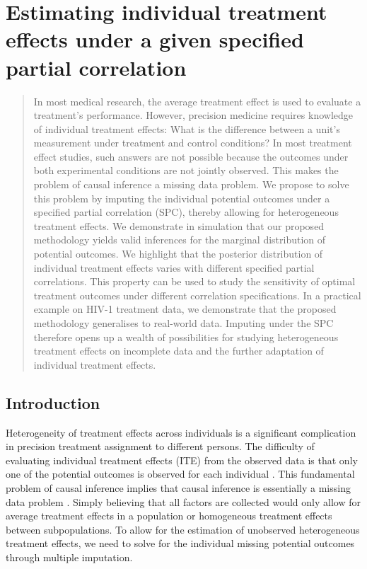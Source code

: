 \chapter{Estimating individual treatment effects under a given specified partial correlation} 
\label{chap4}
	\begin{abstract}
		In most medical research, the average treatment effect is used to evaluate a treatment's performance. However, precision medicine requires knowledge of individual treatment effects: What is the difference between a unit's measurement under treatment and control conditions? In most treatment effect studies, such answers are not possible because the outcomes under both experimental conditions are not jointly observed. This makes the problem of causal inference a missing data problem. We propose to solve this problem by imputing the individual potential outcomes under a specified partial correlation (SPC), thereby allowing for heterogeneous treatment effects. We demonstrate in simulation that our proposed methodology yields valid inferences for the marginal distribution of potential outcomes. We highlight that the posterior distribution of individual treatment effects varies with different specified partial correlations. This property can be used to study the sensitivity of optimal treatment outcomes under different correlation specifications. In a practical example on HIV-1 treatment data, we demonstrate that the proposed methodology generalises to real-world data. Imputing under the SPC therefore opens up a wealth of possibilities for studying heterogeneous treatment effects on incomplete data and the further adaptation of individual treatment effects.
	\end{abstract}
	
	\section{Introduction}
	\label{sec:4.1}
	Heterogeneity of treatment effects across individuals is a significant complication in precision treatment assignment to different persons. The difficulty of evaluating individual treatment effects (ITE) from the observed data is that only one of the potential outcomes is observed for each individual \citep{rubin1974estimating, hernan2010causal}. This fundamental problem of causal inference implies that causal inference is essentially a missing data problem \citep{rubin2005causal, ding2018causal}. Simply believing that all factors are collected would only allow for average treatment effects in a population or homogeneous treatment effects between subpopulations. To allow for the estimation of unobserved heterogeneous treatment effects, we need to solve for the individual missing potential outcomes through multiple imputation. 
	
